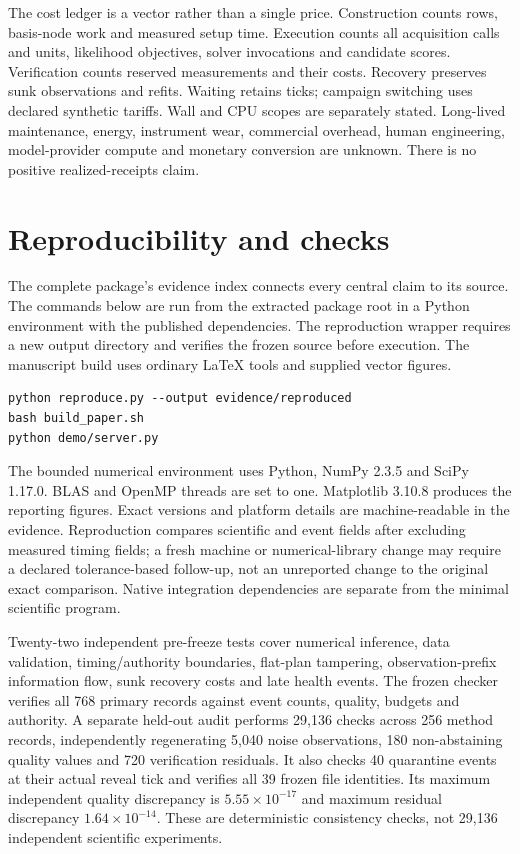 \documentclass[11pt,letterpaper]{article}
\begin{document}
The cost ledger is a vector rather than a single price. Construction counts rows, basis-node work and measured setup time. Execution counts all acquisition calls and units, likelihood objectives, solver invocations and candidate scores. Verification counts reserved measurements and their costs. Recovery preserves sunk observations and refits. Waiting retains ticks; campaign switching uses declared synthetic tariffs. Wall and CPU scopes are separately stated. Long-lived maintenance, energy, instrument wear, commercial overhead, human engineering, model-provider compute and monetary conversion are unknown. There is no positive realized-receipts claim.

\section{Reproducibility and checks}

The complete package's evidence index connects every central claim to its source. The commands below are run from the extracted package root in a Python environment with the published dependencies. The reproduction wrapper requires a new output directory and verifies the frozen source before execution. The manuscript build uses ordinary \LaTeX{} tools and supplied vector figures.

\begin{minipage}{\linewidth}
\begin{verbatim}
python reproduce.py --output evidence/reproduced
bash build_paper.sh
python demo/server.py
\end{verbatim}
\end{minipage}

The bounded numerical environment uses Python, NumPy 2.3.5 and SciPy 1.17.0. BLAS and OpenMP threads are set to one. Matplotlib 3.10.8 produces the reporting figures. Exact versions and platform details are machine-readable in the evidence. Reproduction compares scientific and event fields after excluding measured timing fields; a fresh machine or numerical-library change may require a declared tolerance-based follow-up, not an unreported change to the original exact comparison. Native integration dependencies are separate from the minimal scientific program.

Twenty-two independent pre-freeze tests cover numerical inference, data validation, timing/authority boundaries, flat-plan tampering, observation-prefix information flow, sunk recovery costs and late health events. The frozen checker verifies all 768 primary records against event counts, quality, budgets and authority. A separate held-out audit performs 29,136 checks across 256 method records, independently regenerating 5,040 noise observations, 180 non-abstaining quality values and 720 verification residuals. It also checks 40 quarantine events at their actual reveal tick and verifies all 39 frozen file identities. Its maximum independent quality discrepancy is $5.55\times10^{-17}$ and maximum residual discrepancy $1.64\times10^{-14}$. These are deterministic consistency checks, not 29,136 independent scientific experiments.
\end{document}
